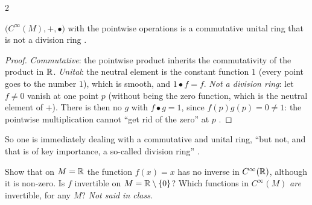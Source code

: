 \begin{paracol}{2}
\begin{proposition}\label{prop:rm-cinf-ring}
$\bigl(C^\infty(M),+,\bullet\bigr)$ with the pointwise operations is a commutative unital ring that is not a division ring .
\end{proposition}
\begin{proof}
\emph{Commutative}: the pointwise product inherits the commutativity of the product in $\mathbb{R}$.
\emph{Unital}: the neutral element is the constant function $1$ (every point goes to the number $1$), which is smooth, and $1\bullet f=f$.
\emph{Not a division ring}: let $f\ne0$ vanish at one point $p$ (without being the zero function, which is the neutral element of $+$). There is then no $g$ with $f\bullet g=1$, since $f(p)g(p)=0\ne1$:
the pointwise multiplication cannot ``get rid of the zero'' at $p$     .
\end{proof}
So one is immediately dealing with a commutative and unital ring, ``but not, and that is of key importance, a so-called division ring''  .
\begin{exercise}\label{ex:rm-zero}
Show that on $M=\mathbb{R}$ the function $f(x)=x$ has no inverse in $C^\infty(\mathbb{R})$, although it is non-zero. Is $f$ invertible on $M=\mathbb{R}\setminus\{0\}$? Which functions in $C^\infty(M)$ \emph{are} invertible, for any $M$? \emph{Not said in class.}
\end{exercise}


\end{paracol}
